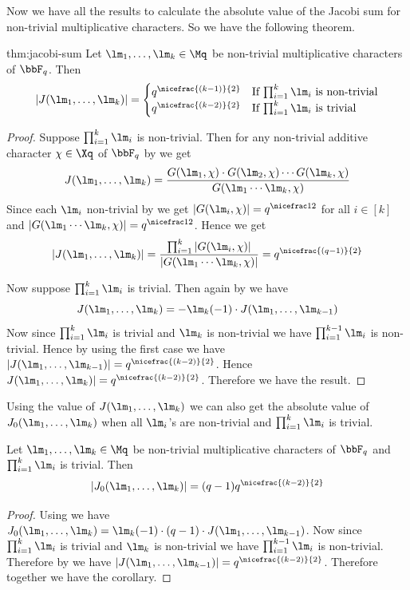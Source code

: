 Now we have all the results to calculate the absolute value of the Jacobi sum for non-trivial multiplicative characters. So we have the following theorem. 
\begin{Theorem}{}{thm:jacobi-sum}
  Let $\lm_1,\dots,\lm_k\in\Mq$ be non-trivial multiplicative characters of $\bbF_q$. Then $$|J(\lm_1,\dots,\lm_k)|=\begin{cases}
    q^{\nicefrac{(k-1)}{2}}& \text{If $\prod_{i=1}^k \lm_i$ is non-trivial}\\ 
    q^{\nicefrac{(k-2)}{2}}& \text{If $\prod_{i=1}^k \lm_i$ is trivial}
  \end{cases}$$
\end{Theorem}
\begin{proof}
  Suppose $\prod_{i=1}^k\lm_i$ is non-trivial. Then for any non-trivial additive character $\chi\in\Xq$ of $\bbF_q$ by  we get $$J(\lm_1,\dots, \lm_k)=\frac{G(\lm_1,\chi)\cdot G(\lm_2,\chi)\cdots G(\lm_k,\chi)}{G(\lm_1\cdots \lm_k,\chi)}$$Since each $\lm_i$ non-trivial by  we get $|G(\lm_i,\chi)|=q^{\nicefrac12}$ for all $i\in[k]$ and $|G(\lm_1\cdots\lm_k,\chi)|=q^{\nicefrac12}$. Hence we get $$|J(\lm_1,\dots,\lm_k)|=\frac{\prod_{i=1}^k|G(\lm_i,\chi)|}{|G(\lm_1\cdots\lm_k,\chi)|}=q^{\nicefrac{(q-1)}{2}}$$
  
  Now suppose $\prod_{i=1}^k\lm_i$ is trivial. Then again by  we have $$J(\lm_1,\dots, \lm_k) = -\lm_k(-1)\cdot J(\lm_1,\dots, \lm_{k-1})$$Now since $\prod_{i=1}^k\lm_i$ is trivial and $\lm_k$ is non-trivial we have $\prod_{i=1}^{k-1}\lm_i$ is non-trivial. Hence by using the first case we have $|J(\lm_1,\dots,\lm_{k-1})|=q^{\nicefrac{(k-2)}{2}}$. Hence $J(\lm_1,\dots, \lm_k)|=q^{\nicefrac{(k-2)}{2}}$. Therefore we have the result. 
\end{proof}

Using the value of $J(\lm_1,\dots,\lm_k)$ we can also get the absolute value of $J_0(\lm_1,\dots,\lm_k)$ when all $\lm_i$'s are non-trivial and $\prod_{i=1}^k\lm_i$ is trivial. 
\begin{corolary}{}{}
  Let $\lm_1,\dots,\lm_k\in\Mq$ be non-trivial multiplicative characters of $\bbF_q$ and $\prod_{i=1}^k\lm_i$ is trivial. Then $$|J_0(\lm_1,\dots,\lm_k)|=(q-1)q^{\nicefrac{(k-2)}{2}}$$
\end{corolary}
\begin{proof}
  Using  we have $J_0(\lm_1,\dots,\lm_k)=\lm_k(-1)\cdot (q-1)\cdot J(\lm_1,\dots,\lm_{k-1})$. Now since $\prod_{i=1}^k\lm_i$ is trivial and $\lm_k$ is non-trivial we have $\prod_{i=1}^{k-1}\lm_i$ is non-trivial. Therefore by  we have $|J(\lm_1,\dots,\lm_{k-1})|=q^{\nicefrac{(k-2)}{2}}$. Therefore together we have the corollary. 
\end{proof}

